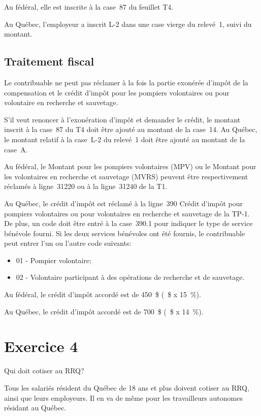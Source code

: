 Au fédéral, elle est inscrite à la case~87 du feuillet T4. 

Au Québec, l'employeur a inscrit \og L-2 \fg{} dans une case vierge du relevé~1, suivi du montant.


\subsection{Traitement fiscal}
Le contribuable ne peut pas réclamer à la fois la partie exonérée d'impôt de la compensation et le crédit d'impôt pour les pompiers volontaires ou pour volontaire en recherche et sauvetage. 

S'il veut renoncer à l'exonération d'impôt et demander le crédit, le montant inscrit à la case~87 du T4 doit être ajouté au montant de la case~14. Au Québec, le montant relatif à la case~\og L-2 \fg{} du relevé~1 doit être ajouté au montant de la case~A.

Au fédéral, le Montant pour les pompiers volontaires (MPV) ou le Montant pour les volontaires en recherche et sauvetage (MVRS) peuvent être respectivement réclamés à ligne~31220 ou à la ligne~31240 de la T1. 

Au Québec, le crédit d'impôt est réclamé à la ligne~390 \og Crédit d'impôt pour pompiers volontaires ou pour volontaires en recherche et sauvetage \fg{} de la TP-1. De plus, un code doit être entré à la case~390.1 pour indiquer le type de service bénévole fourni. Si les deux services bénévoles ont été fournis, le contribuable peut entrer l'un ou l'autre code suivants:
\begin{itemize}
	\item 01 - Pompier volontaire; 
	\item 02 - Volontaire participant à des opérations de recherche et de sauvetage.
\end{itemize}

Au fédéral, le crédit d'impôt accordé est de 450~\$ (~\$ x 15~\%).

Au Québec, le crédit d'impôt accordé est de 700~\$ (~\$ x 14~\%).




\section{Exercice 4}
\setcounter{question}{0}
\begin{question}
	Qui doit cotiser au RRQ?
\end{question}
Tous les salariés résident du Québec de 18 ans et plus doivent cotiser au RRQ, ainsi que leurs employeurs. Il en va de même pour les travailleurs autonomes résidant au Québec.

